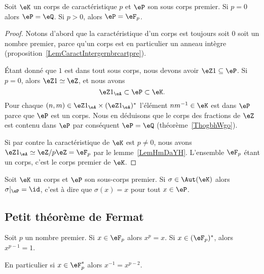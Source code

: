 \begin{proposition}
    Soit \( \eK\) un corps de caractéristique \( p\) et \( \eP\) son sous corps premier. Si \( p=0\) alors \( \eP=\eQ\). Si \( p>0\), alors \( \eP=\eF_p\).
\end{proposition}

\begin{proof}
    Notons d'abord que la caractéristique d'un corps est toujours soit 0 soit un nombre premier, parce qu'un corps est en particulier un anneau intègre (proposition~\ref{LemCaractIntergernbrcartpre}).

    Étant donné que \( 1\) est dans tout sous corps, nous devons avoir \( \eZ 1\subseteq \eP\). Si \( p=0\), alors \( \eZ 1\simeq \eZ\), et nous avons
    \begin{equation}
        \eZ 1_{\eA}\subset \eP\subset \eK.
    \end{equation}
    Pour chaque \( (n,m)\in \eZ 1_{\eA}\times (\eZ 1_{\eA})^*\) l'élément \( nm^{-1}\in \eK\) est dans \( \eP\) parce que \( \eP\) est un corps. Nous en déduisons que le corps des fractions de \( \eZ\) est contenu dans \( \eP\) par conséquent \( \eP=\eQ\) (théorème~\ref{ThogbhWgo}).

    Si par contre la caractéristique de \( \eK\) est \( p\neq 0\), nous avons \( \eZ 1_{\eA}\simeq\eZ/p\eZ=\eF_p\) par le lemme~\ref{LemHmDaYH}. L'ensemble \( \eF_p\) étant un corps, c'est le corps premier de \( \eK\).
\end{proof}

\begin{proposition}     \label{PropqPPrgJ}
    Soit \( \eK\) un corps et \( \eP\) son sous-corps premier. Si \( \sigma\in\Aut(\eK)\) alors \( \sigma|_{\eP}=\id\), c'est à dire que $\sigma(x)=x$ pour tout \( x\in \eP\).
\end{proposition}

\subsection{Petit théorème de Fermat}

\begin{theorem}       \label{ThoOPQOiO}   
    Soit \( p\) un nombre premier. Si \( x\in \eF_p\) alors \( x^p=x\). Si \( x\in(\eF_p)^*\), alors \( x^{p-1}=1\).

    En particulier si \( x\in \eF_p^*\) alors \( x^{-1}=x^{p-2}\).
\end{theorem}

